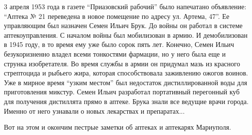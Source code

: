 3 апреля 1953 года в газете \enquote{Приазовский рабочий} было напечатано объявление:
\enquote{Аптека № 21 переведена в новое помещение по адресу ул. Артема, 47}.  Ее
управляющим был назначен Семен Ильич Брук. До войны он работал в системе
аптекоуправления. С началом войны был мобилизован в армию. И демобилизован в
1945 году,  в то время ему уже было сорок пять лет. Конечно, Семен Ильич
безукоризненно владел всеми тонкостями фармации, но у него была еще и струнка
изобретателя. Во время службы в армии он придумал мазь из красного стрептоцида
и рыбьего жира, которая способствовала заживлению ожогов воинов. Уже в мирное
время \enquote{узким местом} был недостаток дистиллированной воды для приготовления
микстур. Семен Ильич разработал портативный перегонный куб для получения
дистиллята прямо в аптеке. Брука знали все ведущие врачи города. Именно от него
узнавали о новых лекарствах и препаратах...

Вот на этом и окончим пестрые заметки об аптеках и аптекарях Мариуполя.
